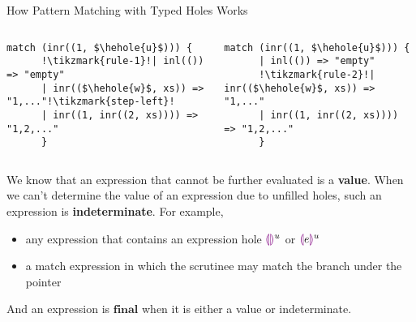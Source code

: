 \documentclass[notheorems]{beamer}
\theoremstyle{slplain}
\numberwithin{thm}{section}
\newlength{\onecolwid}
\begin{document}
\begin{frame}[containsverbatim]
\begin{columns}[t]
\begin{column}{\onecolwid}
\begin{block}{How Pattern Matching with Typed Holes Works}
  \begin{columns}
    \begin{column}{0.5\textwidth}
    \begin{lstlisting}[basicstyle=\small,name=syntax 1,caption={Does Not Match},captionpos=b,escapechar=!,mathescape]
      match (inr((1, $\hehole{u}$))) {
      !\tikzmark{rule-1}!| inl(()) => "empty"
      | inr(($\hehole{w}$, xs)) => "1,..."!\tikzmark{step-left}!
      | inr((1, inr((2, xs)))) => "1,2,..."
      }
    \end{lstlisting}
    \end{column}
    \begin{column}{0.5\textwidth}
    \begin{lstlisting}[basicstyle=\small,name=syntax 2,caption={May Match},captionpos=b,escapechar=!,mathescape]
      match (inr((1, $\hehole{u}$))) {
      | inl(()) => "empty"
      !\tikzmark{rule-2}!| inr(($\hehole{w}$, xs)) => "1,..."
      | inr((1, inr((2, xs)))) => "1,2,..."
      }
    \end{lstlisting}
    \end{column}
  \end{columns}
  We know that an expression that cannot be further evaluated is a \textbf{value}.
  When we can't determine the value of an expression due to unfilled holes, such an expression is \textbf{indeterminate}. For example,
  \begin{itemize}
    \item any expression that contains an expression hole $\textcolor{violet}{\llparenthesis}\textcolor{violet}{\rrparenthesis}^{u}$ or $\textcolor{violet}{\llparenthesis} e\textcolor{violet}{\rrparenthesis}^{u}$
    \item a match expression in which the scrutinee may match the branch under the pointer
  \end{itemize}
  And an expression is $\textbf{final}$ when it is either a value or indeterminate.
\end{block}


\end{column} %


\end{columns}
\end{frame}
\end{document}

